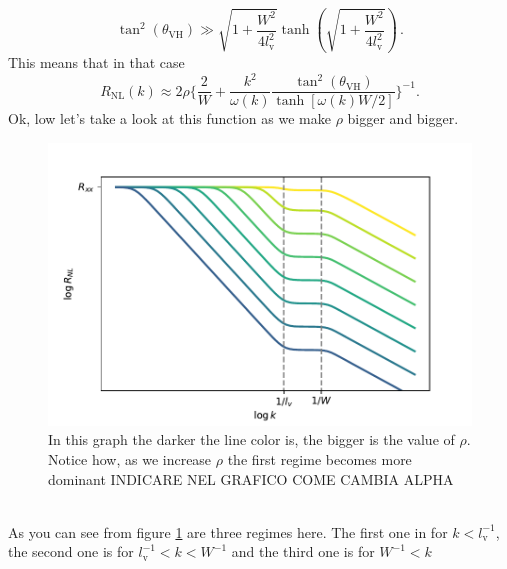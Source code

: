 \begin{equation}
    \tan^2(\theta_{\textrm{VH}})\gg \sqrt{1+\frac {W^2}{4l_{\textrm{v}}^2}}\tanh\left(\sqrt{1+\frac {W^2}{4l_{\textrm{v}}^2}}\right)
    \label{eq:highrhocond}\,.
\end{equation}
This means that in that case
\begin{equation}
     R_{\textrm{NL}}(k)\approx 2\rho
    \bigg\{
        \frac 2W+ \frac {k^2}{\omega(k)}\frac{\tan^2(\theta_{\textrm{VH}})}{\tanh[\omega(k)W/2]}    
    \bigg\}^{-1}.
    \label{eq:rhotoinf}
\end{equation}
Ok, low let's take a look at this function as we make $\rho$ bigger and bigger.
\begin{figure}[h!]
    \centering
    \includegraphics[width=\linewidth]{Immagini/rnl/rho2.pdf}
    \caption{In this graph the darker the line color is, the bigger is the value of $\rho$. Notice how, as we increase $\rho$ the first regime becomes more dominant INDICARE NEL GRAFICO COME CAMBIA ALPHA}
    \label{fig:rho2}
\end{figure}\\
As you can see from figure \ref{fig:rho2} are three regimes here. The first one in for $k<l_{\textrm{v}}^{-1}$, the second one is for $l_{\textrm{v}}^{-1}<k<W^{-1}$ and the third one is for $W^{-1}<k$
